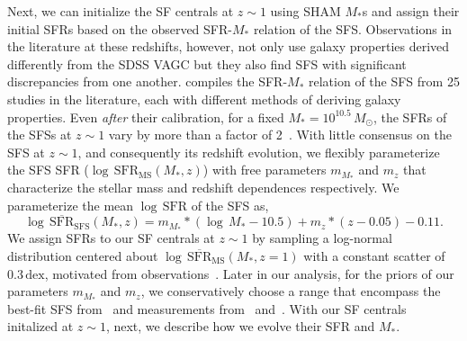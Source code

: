 \documentclass[12pt, letterpaper, preprint, tighten]{aastex}
\newcommand{\beq}{\begin{equation}}
\newcommand{\eeq}{\end{equation}}
\begin{document}
Next, we can initialize the SF centrals at $z\sim1$ using SHAM $M_*$s and 
assign their initial SFRs based on the observed SFR-$M_*$ relation of the SFS. 
Observations in the literature at these redshifts, however, not only use 
galaxy properties derived differently from the SDSS VAGC but they also 
find SFS with significant discrepancies from one another. \cite{speagle2014} 
compiles the SFR-$M_*$ relation of the SFS from 25 studies in the literature, 
each with different methods of deriving galaxy properties. Even \emph{after} 
their calibration, for a fixed $M_* = 10^{10.5}\, M_\odot$, the SFRs of the 
SFSs at $z \sim 1$ vary by more than a factor of 2~\citep[see Figure 2 of][]{speagle2014}. 
With little consensus on the SFS at $z\sim1$, and consequently its redshift
evolution, we flexibly parameterize the SFS SFR ($\log\,\mathrm{SFR}_\mathrm{MS}(M_*, z)$) 
with free parameters $m_{M_*}$ and $m_z$ that characterize the stellar mass 
and redshift dependences respectively.  %
We parameterize the mean $\log\,\mathrm{SFR}$ of the SFS as, 
\beq \label{eq:logsfr_ms}
\log\,\overline{\mathrm{SFR}}_\mathrm{SFS}(M_*, z) =  m_{M_*} * (\log\,M_* - 10.5) + m_z * (z - 0.05) - 0.11.
\eeq
We assign SFRs to our SF centrals at $z\sim1$ by sampling a log-normal 
distribution centered about $\log\,\overline{\mathrm{SFR}}_\mathrm{MS}(M_*, z=1)$ 
with a constant scatter of $0.3\,\mathrm{dex}$, motivated from 
observations~\citep{daddi2007, noeske2007, magdis2012, whitaker2012}.
Later in our analysis, for the priors of our parameters $m_{M_*}$ 
and $m_z$, we conservatively choose a range that encompass the best-fit 
SFS from~\cite{speagle2014} and measurements from~\cite{moustakas2013} 
and~\cite{lee2015}. With our SF centrals initalized at $z \sim 1$, next, 
we describe how we evolve their SFR and $M_*$.
\end{document}
